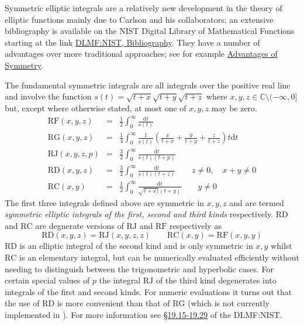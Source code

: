 Symmetric elliptic integrals are a relatively new development in the theory of
elliptic functions mainly due to Carlson and his collaborators; an extensive
bibliography is available on the NIST Digital Library of Mathematical Functions
starting at the link \href{https://dlmf.nist.gov/bib/C#bib449}
{DLMF:NIST, Bibliography}. They have a number of advantages over more
traditional approaches; see for example
\href{https://dlmf.nist.gov/19.15}{Advantages of Symmetry}.

The fundamental symmetric integrals are all integrals over the positive real
line and involve the function $s(t)=\sqrt{t+x}\sqrt{t+y}\sqrt{t+z}$ where
$x,y,z\in \mathbb{C} \setminus(-\infty, 0]$ but, except where otherwise stated, at most
one of $x,y,z$ may be zero.
\begin{eqnarray*}
\mathrm{RF}(x,y,z) & = & \frac{1}{2}\int_0^\infty \frac{\mathrm{d}t}{s(t)}\\
\mathrm{RG}(x,y,z) & = & \frac{1}{4}\int_0^\infty \frac{1}{s(t)}\left(
     \frac{x}{t+x}+\frac{y}{t+y}+\frac{z}{t+z}\right)t\mathrm{d}t\\
\mathrm{RJ}(x,y,z,p) & = & \frac{3}{2}\int_0^\infty \frac{\mathrm{d}t}{s(t)(t+p)}\\
\mathrm{RD}(x,y,z) & = & \frac{3}{2}\int_0^\infty \frac{\mathrm{d}t}{s(t)(t+z)}
\qquad z \neq 0, \quad x+y \neq 0\\
\mathrm{RC}(x,y) & = & \frac{1}{2}\int_0^\infty\frac{\mathrm{d}t}{\sqrt{t+x)}(t+y)}\qquad y \neq 0
\end{eqnarray*}
The first three integrals defined above are symmetric in $x,y,z$ and are termed
\emph{symmetric elliptic integrals of the first, second and third kinds}
respectively. $\mathrm{RD}$ and $\mathrm{RC}$ are degnerate versions of
$\mathrm{RJ}$ and $\mathrm{RF}$ respectively as
\[\mathrm{RD}(x,y,z) =\mathrm{RJ}(x,y,z,z) \qquad 
\mathrm{RC}(x,y) =\mathrm{RF}(x,y,y) \]
$\mathrm{RD}$ is an elliptic integral of the second kind and is only symmetric
in $x,y$ whilst $\mathrm{RC}$ is an elementary integral, but can be numerically
evaluated efficiently without needing to distinguish between the trigonometric
and hyperbolic cases. For certain special values of $p$ the integral
$\mathrm{RJ}$ of the third kind degenerates into integrals of the first and
second kinds. For numeric evaluations it turns out that the use of $\mathrm{RD}$
is more convenient than that of $\mathrm{RG}$ (which is not currently
implemented in \REDUCE). For more information see
\href{https://dlmf.nist.gov/19#PT3}{\S19.15-19.29} of the DLMF:NIST.

